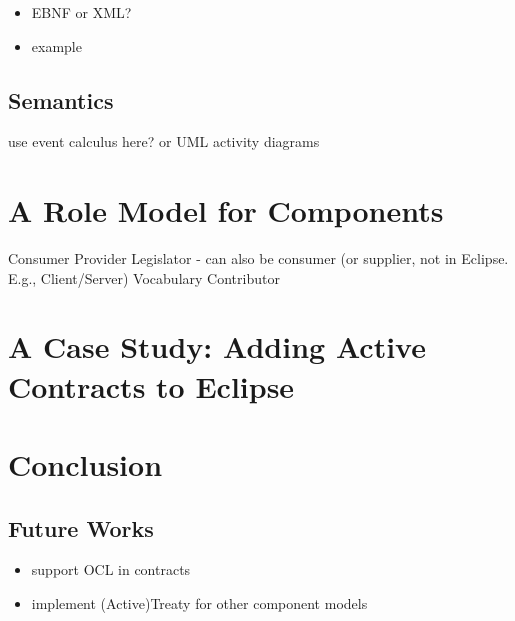 \documentclass{llncs}
\begin{document}
\begin{itemize}
\item EBNF or XML?
\item example
\end{itemize}


\subsection{Semantics}

use event calculus here? or UML activity diagrams



\section{A Role Model for Components}

Consumer
Provider
Legislator - can also be consumer (or supplier, not in Eclipse. E.g., Client/Server)
Vocabulary Contributor



\section{A Case Study: Adding Active Contracts to Eclipse}



\section{Conclusion}


\subsection{Future Works}

\begin{itemize}
	\item support OCL in contracts
	\item implement (Active)Treaty for other component models
\end{itemize}



  
    
\end{document}

